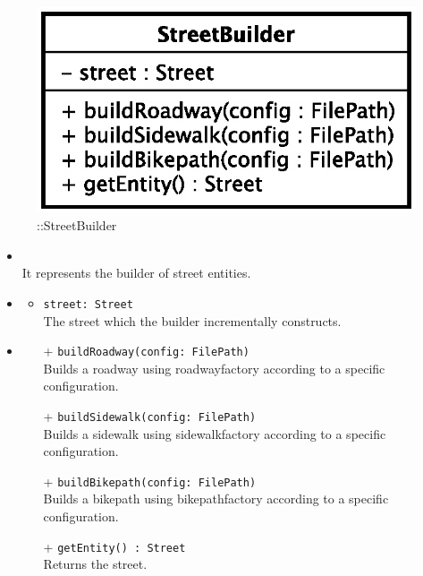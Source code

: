 \begin{figure}[h]
\centering
\includegraphics[scale=0.6,keepaspectratio]{images/solution/app/backend/street_builder.eps}
\caption{\pReactiveBuild::StreetBuilder}
\label{fig:sd-app-street_builder}
\end{figure}
\FloatBarrier
\begin{itemize}
  \item \textbf{\descr} \\
    It represents the builder of street entities.
  \item \textbf{\attrs}
  \begin{itemize}
    \item \texttt{street: Street} \\
The street which the builder incrementally constructs.
  \end{itemize}
  \item \textbf{\ops}
  \begin{itemize} 
    \item[+] \texttt{buildRoadway(config: FilePath)} \\
Builds a roadway using roadwayfactory according to a specific configuration.
    \item[+] \texttt{buildSidewalk(config: FilePath)} \\
Builds a sidewalk using sidewalkfactory according to a specific configuration.
    \item[+] \texttt{buildBikepath(config: FilePath)} \\
Builds a bikepath using bikepathfactory according to a specific configuration.
    \item[+] \texttt{getEntity() : Street} \\
Returns the street.
  \end{itemize}
\end{itemize}
